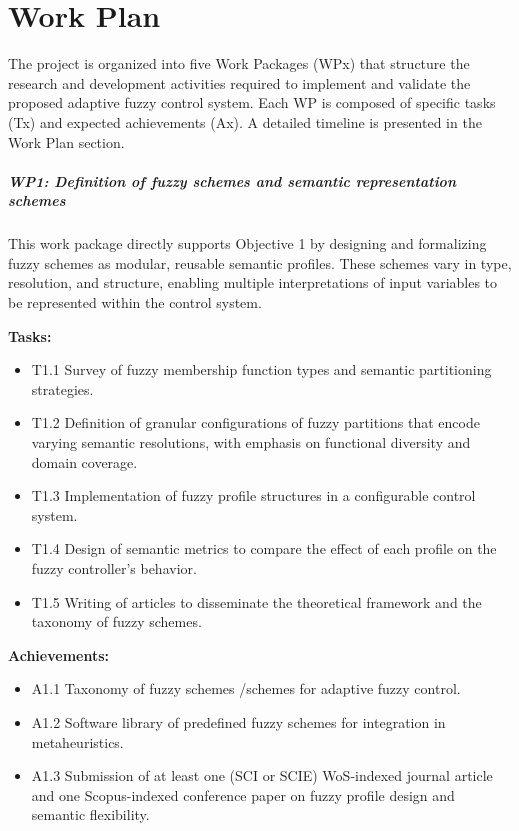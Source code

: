 \chapter{Work Plan} \label{chapter:work_plan}
The project is organized into five Work Packages (WPx) that structure the research and development activities required to implement and validate the proposed adaptive fuzzy control system. Each WP is composed of specific tasks (Tx) and expected achievements (Ax). A detailed timeline is presented in the Work Plan section.

\paragraph{WP1: Definition of fuzzy schemes and semantic representation schemes}
This work package directly supports Objective 1 by designing and formalizing fuzzy schemes as modular, reusable semantic profiles. These schemes vary in type, resolution, and structure, enabling multiple interpretations of input variables to be represented within the control system.

\textbf{Tasks:}
\begin{itemize}
    \item T1.1 Survey of fuzzy membership function types and semantic partitioning strategies.
    \item T1.2 Definition of granular configurations of fuzzy partitions that encode varying semantic resolutions, with emphasis on functional diversity and domain coverage.
    \item T1.3 Implementation of fuzzy profile structures in a configurable control system.
    \item T1.4 Design of semantic metrics to compare the effect of each profile on the fuzzy controller’s behavior.
    \item T1.5 Writing of articles to disseminate the theoretical framework and the taxonomy of fuzzy schemes.
\end{itemize}

\textbf{Achievements:}
\begin{itemize}
    \item A1.1 Taxonomy of fuzzy schemes /schemes for adaptive fuzzy control.
    \item A1.2 Software library of predefined fuzzy schemes for integration in metaheuristics.
    \item A1.3 Submission of at least one (SCI or SCIE) WoS-indexed journal article and one Scopus-indexed conference paper on fuzzy profile design and semantic flexibility.
\end{itemize}

